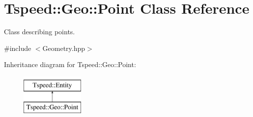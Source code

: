 \hypertarget{classTspeed_1_1Geo_1_1Point}{\section{Tspeed\-:\-:Geo\-:\-:Point Class Reference}
\label{classTspeed_1_1Geo_1_1Point}
}


Class describing points.  




{\ttfamily \#include $<$Geometry.\-hpp$>$}

Inheritance diagram for Tspeed\-:\-:Geo\-:\-:Point\-:\begin{figure}[H]
\begin{center}
\leavevmode
\includegraphics[height=2.000000cm]{classTspeed_1_1Geo_1_1Point}
\end{center}
\end{figure}
